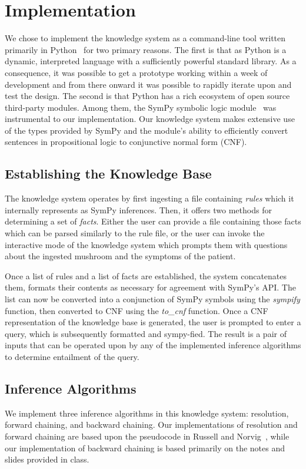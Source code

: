 \documentclass[12pt, conference, compsocconf]{IEEEtran}
\begin{document}
\section{Implementation}
We chose to implement the knowledge system as a command-line tool written primarily in Python~\cite{python-doc} for two primary reasons. 
The first is that as Python is a dynamic, interpreted language with a sufficiently powerful standard library. As a consequence, it was possible to get a prototype working within a week of development and from there onward it was possible to rapidly iterate upon and test the design. 
The second is that Python has a rich ecosystem of open source third-party modules. Among them, the SymPy symbolic logic module~\cite{sympy-doc} was instrumental to our implementation. Our knowledge system makes extensive use of the types provided by SymPy and the module's ability to efficiently convert sentences in propositional logic to conjunctive normal form (CNF).

\subsection{Establishing the Knowledge Base}
The knowledge system operates by first ingesting a file containing \emph{rules} which it internally represents as SymPy inferences. 
Then, it offers two methods for determining a set of \emph{facts}. 
Either the user can provide a file containing those facts which can be parsed similarly to the rule file, or the user can invoke the interactive mode of the knowledge system which prompts them with questions about the ingested mushroom and the symptoms of the patient. 

Once a list of rules and a list of facts are established, the system concatenates them, formats their contents as necessary for agreement with SymPy's API. 
The list can now be converted into a conjunction of SymPy symbols using the \emph{sympify} function, then converted to CNF using the \emph{to\_cnf} function. 
Once a CNF representation of the knowledge base is generated, the user is prompted to enter a query, which is subsequently formatted and sympy-fied. The result is a pair of inputs that can be operated upon by any of the implemented inference algorithms to determine entailment of the query. 

\subsection{Inference Algorithms}
We implement three inference algorithms in this knowledge system: resolution, forward chaining, and backward chaining. Our implementations of resolution and forward chaining are based upon the pseudocode in Russell and Norvig~\cite{russell-norvig-aima}, while our implementation of backward chaining is based primarily on the notes and slides provided in class. 
\end{document}
